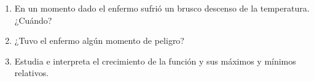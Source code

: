 \documentclass[fleqn]{article}
\begin{document}
\begin{enumerate}
\begin{enumerate}
\item En un momento dado el enfermo sufrió un brusco descenso de la temperatura. ¿Cuándo?\noanswer
\item ¿Tuvo el enfermo algún momento de peligro?\noanswer
\item Estudia e interpreta el crecimiento de la función y sus
máximos y mínimos relativos.\noanswer
\end{enumerate}
 \end{enumerate}
\end{document}
